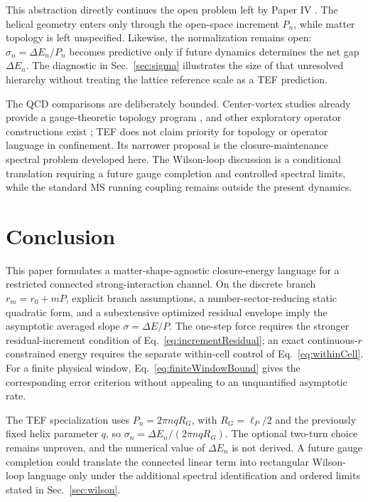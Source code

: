 \documentclass[10pt]{article}
\newcommand{\MSbar}{\overline{\mathrm{MS}}}
\begin{document}
This abstraction directly continues the open problem left by Paper IV \cite{WuMatterSpace}. The helical geometry enters only through the open-space increment $P_n$, while matter topology is left unspecified. Likewise, the normalization remains open: $\sigma_n=\Delta E_n/P_n$ becomes predictive only if future dynamics determines the net gap $\Delta E_n$. The diagnostic in Sec.~\ref{sec:sigma} illustrates the size of that unresolved hierarchy without treating the lattice reference scale as a TEF prediction.

The QCD comparisons are deliberately bounded. Center-vortex studies already provide a gauge-theoretic topology program \cite{Virgili2025}, and other exploratory operator constructions exist \cite{Arneth2026}; TEF does not claim priority for topology or operator language in confinement. Its narrower proposal is the closure-maintenance spectral problem developed here. The Wilson-loop discussion is a conditional translation requiring a future gauge completion and controlled spectral limits, while the standard $\MSbar$ running coupling remains outside the present dynamics.

\section{Conclusion}

This paper formulates a matter-shape-agnostic closure-energy language for a restricted connected strong-interaction channel. On the discrete branch $r_m=r_0+mP$, explicit branch assumptions, a number-sector-reducing static quadratic form, and a subextensive optimized residual envelope imply the asymptotic averaged slope $\sigma=\Delta E/P$. The one-step force requires the stronger residual-increment condition of Eq.~\eqref{eq:incrementResidual}; an exact continuous-$r$ constrained energy requires the separate within-cell control of Eq.~\eqref{eq:withinCell}. For a finite physical window, Eq.~\eqref{eq:finiteWindowBound} gives the corresponding error criterion without appealing to an unquantified asymptotic rate.

The TEF specialization uses $P_n=2\pi nqR_G$, with $R_G=\ell_P/2$ and the previously fixed helix parameter $q$, so $\sigma_n=\Delta E_n/(2\pi nqR_G)$. The optional two-turn choice remains unproven, and the numerical value of $\Delta E_n$ is not derived. A future gauge completion could translate the connected linear term into rectangular Wilson-loop language only under the additional spectral identification and ordered limits stated in Sec.~\ref{sec:wilson}.
\end{document}

